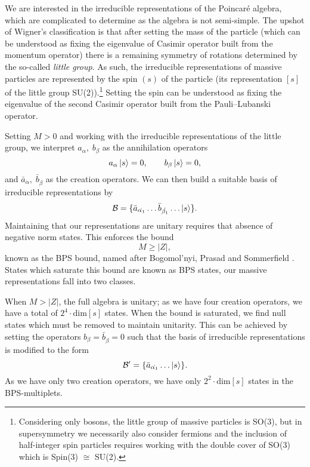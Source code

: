 We are interested in the irreducible representations of the Poincar\'e algebra, which are complicated to determine as the algebra is not semi-simple. The upshot of Wigner's classification \cite{Wigner:1939cj} is that after setting the mass of the particle (which can be understood as fixing the eigenvalue of Casimir operator built from the momentum operator) there is a remaining symmetry of rotations determined by the so-called \emph{little group}. As such, the irreducible representations of massive particles are represented by the spin $(s)$ of the particle (its representation $[s]$ of the little group SU(2)).\footnote{Considering only bosons, the little group of massive particles is SO(3), but in supersymmetry we necessarily also consider fermions and the inclusion of half-integer spin particles requires working with the double cover of SO(3) which is Spin(3) $\cong$ SU(2).} Setting the spin can be understood as fixing the eigenvalue of the second Casimir operator built from the Pauli–Lubanski operator. 

Setting $M > 0$ and working with the irreducible representations of the little group, we interpret $a_\alpha, \; b_\beta$ as the annihilation operators  
\begin{equation*}
	a_\alpha \ket{s} = 0, \qquad b_\beta \ket{s} = 0,
\end{equation*}
and $\bar{a}_{\dot{\alpha}}, \; \bar{b}_{\dot{\beta}}$ as the creation operators. We can then build a suitable basis of irreducible representations by
\begin{equation*}
	\mathcal{B} = \{ \bar{a}_{\dot{\alpha_1}} \ldots \bar{b}_{\dot{\beta_1}} \ldots \ket{s} \}.
\end{equation*}
Maintaining that our representations are unitary requires that absence of negative norm states. This enforces the bound
\begin{equation*}
	M \geq |Z|,
\end{equation*} 
known as the BPS bound, named after Bogomol'nyi, Prasad and Sommerfield \cite{Bogomolny:1975de, Prasad:1975kr}. States which saturate this bound are known as BPS states, our massive representations fall into two classes. 

When $M > |Z|$, the full algebra is unitary; as we have four creation operators, we have a total of $2^4 \cdot \text{dim}[s]$ states. When the bound is saturated, we find null states which must be removed to maintain unitarity. This can be achieved by setting the operators $b_\beta = \bar{b}_{\dot{\beta}} = 0$ such that the basis of irreducible representations is modified to the form
\begin{equation*}
	\mathcal{B}^\prime = \{ \bar{a}_{\dot{\alpha_1}} \ldots \ket{s} \}.
\end{equation*}
As we have only two creation operators, we have only $2^2 \cdot \text{dim}[s]$ states in the BPS-multiplets.

